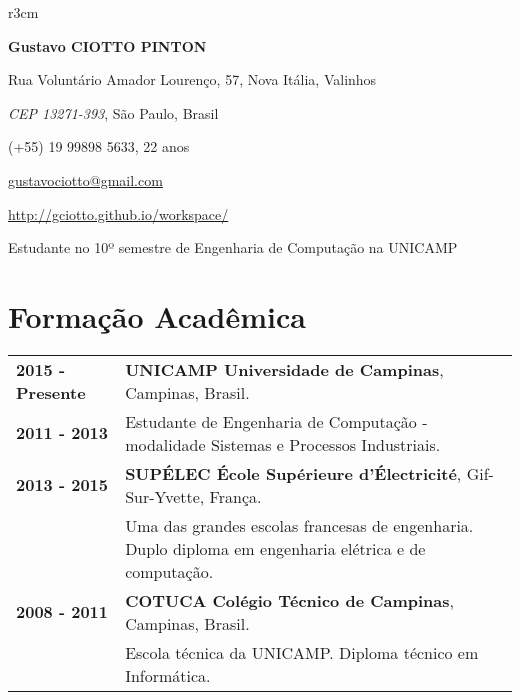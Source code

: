 \documentclass[10pt, a4paper]{article}
\author{Gustavo Ciotto Pinton}
\begin{document}
\pagestyle{empty} 

\begin{wrapfigure}{r}{3cm}
  \vspace{-20pt}
  \begin{center}
  \end{center}
\end{wrapfigure}

\textbf{\LARGE Gustavo CIOTTO PINTON}

Rua Voluntário Amador Lourenço, 57, Nova Itália, Valinhos

\textit{CEP 13271-393}, São Paulo, Brasil

(+55) 19 99898 5633, 22 anos

\url{gustavociotto@gmail.com} 

\url{http://gciotto.github.io/workspace/}

\vspace{8pt}

{\centerline {\large Estudante no 10º semestre de Engenharia de
Computação na UNICAMP}}



\section{Formação Acadêmica}

\begin{tabular}{p{} p{}}

 \textbf{2015 - Presente} & \textbf{UNICAMP Universidade de Campinas}, Campinas,
 Brasil.
 \\
 \textbf{2011 - 2013} & Estudante de Engenharia de Computação - modalidade
 Sistemas e Processos Industriais. \vspace{8pt}\\

 \textbf{2013 - 2015} & \textbf{SUPÉLEC  École Supérieure d'Électricité},
 Gif-Sur-Yvette, França. \\
 & Uma das grandes escolas francesas de engenharia. Duplo diploma em
 engenharia elétrica e de computação. \vspace{8pt}
 \\
  
 
 \textbf{2008 - 2011} & \textbf{COTUCA Colégio Técnico de Campinas}, Campinas,
 Brasil. \\
 & Escola técnica da UNICAMP. Diploma técnico em Informática. \\
\end{tabular}
\end{document}

